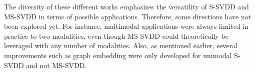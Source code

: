 The diversity of these different works emphasizes the versatility of S-SVDD and MS-SVDD in terms of possible applications. Therefore, some directions have not been explored yet. For instance, multimodal applications were always limited in practice to two modalities, even though MS-SVDD could theoretically be leveraged with any number of modalities. Also, as mentioned earlier, several improvements such as graph embedding were only developed for unimodal S-SVDD and not MS-SVDD. %